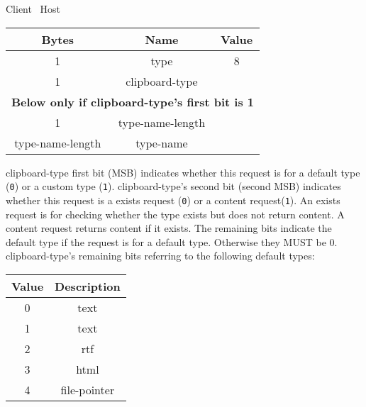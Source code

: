 \begin{center}
    Client \textrightarrow\ Host\\
    \begin{tabular}{|c|c|c|}
        \hline
        \textbf{Bytes}   & \textbf{Name}    & \textbf{Value} \\
        \hline
        1                & type             & 8              \\
        \hline
        1                & clipboard-type   &                \\
        \hline
        \multicolumn{3}{|c|}{\textbf{Below only if clipboard-type's first bit is 1} } \\
        \hline
        1                & type-name-length &                \\
        \hline
        type-name-length & type-name        &                \\
        \hline
    \end{tabular}
\end{center}

clipboard-type first bit (MSB) indicates whether this request is for a default type (\texttt{0}) or a custom type
(\texttt{1}). clipboard-type's second bit (second MSB) indicates whether this request is a exists request (\texttt{0}) or a
content request(\texttt{1}). An exists request is for checking whether the type exists but does not return content. A
content request returns content if it exists. The remaining bits indicate the default type if the request is for a
default type. Otherwise they MUST be 0.\\

clipboard-type's remaining bits referring to the following default types:

\begin{center}
    \begin{tabular}{|c|c|}
        \hline
        \textbf{Value} & \textbf{Description} \\
        \hline
        0              & text                 \\
        \hline
        1              & text                 \\
        \hline
        2              & rtf                  \\
        \hline
        3              & html                 \\
        \hline
        4              & file-pointer         \\
        \hline
    \end{tabular}
\end{center}

